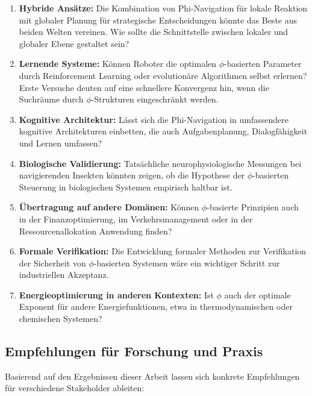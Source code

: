 ﻿\documentclass[a4paper,12pt]{article}
\theoremstyle{definition}
\begin{document}
\begin{enumerate}
	\item \textbf{Hybride Ansätze:} Die Kombination von Phi-Navigation für lokale Reaktion mit globaler Planung für strategische Entscheidungen könnte das Beste aus beiden Welten vereinen. Wie sollte die Schnittstelle zwischen lokaler und globaler Ebene gestaltet sein?
	
	\item \textbf{Lernende Systeme:} Können Roboter die optimalen $\phi$-basierten Parameter durch Reinforcement Learning oder evolutionäre Algorithmen selbst erlernen? Erste Versuche deuten auf eine schnellere Konvergenz hin, wenn die Suchräume durch $\phi$-Strukturen eingeschränkt werden.
	
	\item \textbf{Kognitive Architektur:} Lässt sich die Phi-Navigation in umfassendere kognitive Architekturen einbetten, die auch Aufgabenplanung, Dialogfähigkeit und Lernen umfassen?
	
	\item \textbf{Biologische Validierung:} Tatsächliche neurophysiologische Messungen bei navigierenden Insekten könnten zeigen, ob die Hypothese der $\phi$-basierten Steuerung in biologischen Systemen empirisch haltbar ist.
	
	\item \textbf{Übertragung auf andere Domänen:} Können $\phi$-basierte Prinzipien auch in der Finanzoptimierung, im Verkehrsmanagement oder in der Ressourcenallokation Anwendung finden?
	
	\item \textbf{Formale Verifikation:} Die Entwicklung formaler Methoden zur Verifikation der Sicherheit von $\phi$-basierten Systemen wäre ein wichtiger Schritt zur industriellen Akzeptanz.
	
	\item \textbf{Energieoptimierung in anderen Kontexten:} Ist $\phi$ auch der optimale Exponent für andere Energiefunktionen, etwa in thermodynamischen oder chemischen Systemen?
\end{enumerate}

\subsection{Empfehlungen für Forschung und Praxis}

Basierend auf den Ergebnissen dieser Arbeit lassen sich konkrete Empfehlungen für verschiedene Stakeholder ableiten:
\end{document}
